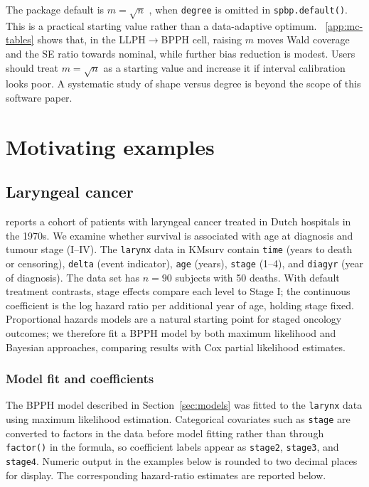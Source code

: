 \documentclass[5p,lefttitle]{elsarticle}
\providecommand{\pkg}[1]{\textsf{#1}}
\begin{document}
{The package default is \(m=\sqrt{n}\) \citep{Osman:2012}, when \texttt{degree} is omitted in
\texttt{spbp.default()}. This is a
practical starting value rather than a data-adaptive optimum.
~\ref{app:mc-tables} shows that, in the LLPH\(\to\)BPPH cell,
raising \(m\) moves Wald coverage and the SE ratio towards nominal, while
further bias reduction is modest. Users should treat \(m=\sqrt{n}\) as a
starting value and increase it if interval calibration looks poor. A
systematic study of shape versus degree is beyond the scope of this
software paper.

\section{Motivating examples}\label{sec:illustrations}

\subsection{Laryngeal cancer}\label{sec:illus-larynx}

\citet{Kardaun:1983} reports a cohort of patients with laryngeal cancer treated
in Dutch hospitals in the 1970s. We examine whether survival is
associated with age at diagnosis and tumour stage (I--IV). The \texttt{larynx} data in \pkg{KMsurv} \citep{Klein:1997} contain
\texttt{time} (years to death or censoring), \texttt{delta} (event
indicator), \texttt{age} (years), \texttt{stage} (1--4), and \texttt{diagyr}
(year of diagnosis). The data set has
\(n=90\) subjects with 50 deaths. With default treatment contrasts,
stage effects compare each level to Stage I; the continuous coefficient is
the log hazard ratio per additional year of age, holding stage fixed.
Proportional hazards models are a natural starting point for staged
oncology outcomes; we therefore fit a BPPH model by both maximum likelihood
and Bayesian approaches, comparing results with Cox partial likelihood
estimates.

\subsubsection{Model fit and coefficients}\label{model-fit-and-coefficients}

The BPPH model described in Section~\ref{sec:models} was fitted to the
\texttt{larynx} data using maximum likelihood estimation. Categorical
covariates such as \texttt{stage} are converted to factors in the data
before model fitting rather than through \texttt{factor()} in the formula,
so coefficient labels appear as \texttt{stage2}, \texttt{stage3}, and
\texttt{stage4}. Numeric output in the examples below is rounded to two
decimal places for display. The corresponding hazard-ratio estimates are
reported below.

}
\end{document}
